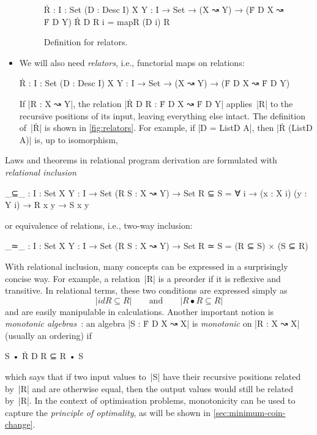 \begin{itemize}
\begin{figure}
\begin{code}
Ṙ :  {I : Set} (D : Desc I) {X Y : I → Set} → (X ↝ Y) → (Ḟ D X ↝ Ḟ D Y)
Ṙ D R {i} = mapR (D i) R
\end{code}
\caption{Definition for relators.}
\label{fig:relators}
\end{figure}
\item We will also need \emph{relators}, i.e., functorial maps on relations:
\begin{code}
Ṙ :  {I : Set} (D : Desc I) {X Y : I → Set} →
     (X ↝ Y) → (Ḟ D X ↝ Ḟ D Y)
\end{code}
If |R : X ↝ Y|, the relation |Ṙ D R : Ḟ D X ↝ Ḟ D Y| applies~|R| to the recursive positions of its input, leaving everything else intact.
The definition of~|Ṙ| is shown in \autoref{fig:relators}.
For example, if |D = ListD A|, then |Ṙ (ListD A)| is, up to isomorphism,
\end{itemize}

Laws and theorems in relational program derivation are formulated with \emph{relational inclusion}
\begin{code}
_⊆_ : {I : Set} {X Y : I → Set} (R S : X ↝ Y) → Set
R ⊆ S = ∀ {i} → (x : X i) (y : Y i) → R x y → S x y
\end{code}
or equivalence of relations, i.e., two-way inclusion:
\begin{code}
_≃_ : {I : Set} {X Y : I → Set} (R S : X ↝ Y) → Set
R ≃ S = (R ⊆ S) × (S ⊆ R)
\end{code}
With relational inclusion, many concepts can be expressed in a surprisingly concise way.
For example, a relation~|R| is a preorder if it is reflexive and transitive.
In relational terms, these two conditions are expressed simply as
\[ |idR ⊆ R| \qquad\text{and}\qquad |R • R ⊆ R| \]
and are easily manipulable in calculations.
Another important notion is \emph{monotonic algebras}~\cite[Section 7.2]{Bird-AoP}: an algebra |S : Ḟ D X ↝ X| is \emph{monotonic} on |R : X ↝ X| (usually an ordering) if
\begin{code}
S • Ṙ D R ⊆ R • S
\end{code}
which says that if two input values to~|S| have their recursive positions related by~|R| and are otherwise equal, then the output values would still be related by~|R|.
In the context of optimisation problems, monotonicity can be used to capture the \emph{principle of optimality}, as will be shown in \autoref{sec:minimum-coin-change}.

